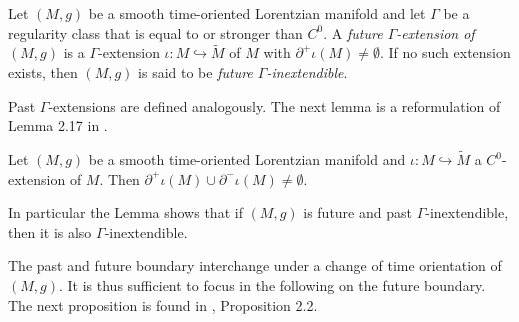 \documentclass[reqno]{article}
\begin{document}
\begin{definition}
Let $(M,g)$  be a smooth time-oriented Lorentzian manifold and let $\Gamma$ be a regularity class that is equal to or stronger than $C^0$. A \emph{future $\Gamma$-extension of $(M,g)$} is a $\Gamma$-extension $\iota : M \hookrightarrow \tilde{M}$  of $M$ with $\partial^+\iota(M) \neq \emptyset$. If no such extension exists, then $(M,g)$ is said to be \emph{future $\Gamma$-inextendible}.
\end{definition}
Past $\Gamma$-extensions are defined analogously.
The next lemma is a reformulation of Lemma 2.17 in \cite{Sbie15}.
\begin{lemma} \label{LemFuturePastExt}
Let $(M,g)$ be a smooth time-oriented Lorentzian manifold and $\iota : M \hookrightarrow \tilde{M}$ a $C^0$-extension of $M$. Then $\partial^+\iota(M) \cup \partial^- \iota(M) \neq \emptyset$.
\end{lemma}
In particular the Lemma shows that if $(M,g)$ is future and past $\Gamma$-inextendible, then it is also $\Gamma$-inextendible.

The past and future boundary interchange under a change of time orientation of $(M,g)$. It is thus sufficient to focus in the following on the future boundary.
The next proposition is found in \cite{Sbie18}, Proposition 2.2.
\end{document}
